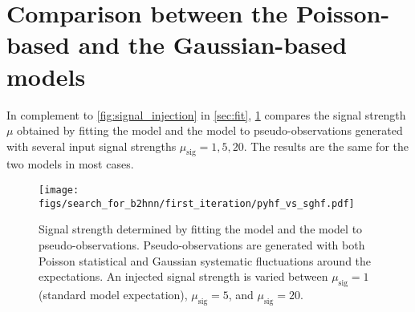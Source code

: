 \clearpage
\section{Comparison between the Poisson-based and the Gaussian-based models} \label{sec:pyhf_vs_sghf}

In complement to \cref{fig:signal_injection} in \cref{sec:fit}, \cref{fig:63_data_sghf_vs_pyhf} compares the signal strength $\mu$ obtained by fitting the \pyhf model and the \sghf model to pseudo-observations generated with several input signal strengths $\mu_{\mathrm{sig}}=1,5,20$.
The results are the same for the two models in most cases.
\vspace{2cm}

\begin{figure}[h]
\centering
\texttt{[image: figs/search\_for\_b2hnn/first\_iteration/pyhf\_vs\_sghf.pdf]}
\caption{
Signal strength determined by fitting the \sghf model and the \pyhf model to pseudo-observations.
Pseudo-observations are generated with both Poisson statistical and Gaussian systematic fluctuations around the expectations.
An injected signal strength is varied between $\mu_{\mathrm{sig}}=1$ (standard model expectation), $\mu_{\mathrm{sig}}=5$, and $\mu_{\mathrm{sig}}=20$.
}
\label{fig:63_data_sghf_vs_pyhf}
\end{figure}

